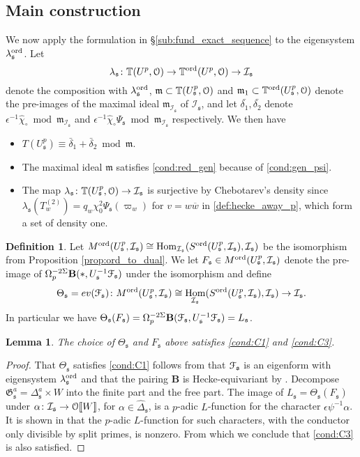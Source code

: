 \documentclass[leqno]{amsart}
\newtheorem{lem}[thm]{Lemma}
\theoremstyle{definition}
\newtheorem{defn}[thm]{Definition}
\theoremstyle{remark}
\newcommand{\eo}{\EuScript{O}}
\DeclareMathOperator{\Hom}{Hom}
\newcommand{\fm}{\mathfrak{m}}
\newcommand{\fs}{\mathfrak{s}}
\newcommand{\bw}{{\overline{w}}}
\newcommand{\fG}{\mathfrak{G}}
\newcommand{\TT}{\mathbb{T}} %
\newcommand{\euF}{\EuScript{F}} %
\newcommand{\I}{\mathcal{I}} %
\newcommand{\ord}{\textnormal{ord}} %
\begin{document}
\subsection{Main construction}

We now apply the formulation in \S\ref{sub:fund_exact_sequence}
to the eigensystem $\lambda^{\ord}_\fs$. Let
\[
    \lambda_\fs\colon \TT(U^p,\eo)\to\TT^{\ord}(U^p,\eo)\to\I_\fs
\]
denote the composition with $\lambda^{\ord}_\fs$,
$\fm\subset \TT(U^p_\fs,\eo)$ and
$\fm_1\subset \TT^\ord(U^p_\fs,\eo)$
denote the pre-images of the maximal ideal $\fm_{\I_\fs}$ of $\I_\fs$,
and let $\bar{\delta_1}, \bar{\delta_2}$
denote $\epsilon^{-1}\hat{\chi}_\circ\bmod \fm_{\I_\fs}$ 
and $\epsilon^{-1}\hat{\chi}_\circ\Psi_\fs\bmod \fm_{\I_\fs}$ 
respectively. We then have
\begin{itemize}
\item $T(U^p_\fs)\equiv\bar{\delta}_1+\bar{\delta}_2\bmod \fm$.
\item The maximal ideal $\fm$ satisfies \eqref{cond:red_gen}
because of \eqref{cond:gen_psi}.
\item The map $\lambda_\fs\colon \TT(U^p_\fs,\eo)\to \I_\fs$
is surjective by Chebotarev's density
since $\lambda_\fs(T_w^{(2)})=q_w\chi_0^2\Psi_\fs(\varpi_w)$
for $v=w\bw$ in \eqref{def:hecke_away_p},
which form a set of density one.
\end{itemize}

\begin{defn}
Let $M^{\ord}(U^p_\fs,\I_\fs)\cong\Hom_{\I_\fs}
(S^{\ord}(U^p_\fs,\I_\fs),\I_\fs)$
be the isomorphism from Proposition \ref{prop:ord_to_dual}.
We let $F_\fs\in M^{\ord}(U^p_\fs,\I_\fs)$
denote the pre-image of
$\Omega_p^{-2\Sigma}\mathbf{B}(*,U_\fs^{-1}\euF_{\fs})$
under the isomorphism and define
\[
    \Theta_\fs=ev(\euF_\fs)\colon 
    M^{\ord}(U^p_\fs,\I_\fs)\cong\Hom_{\I_\fs}
    (S^{\ord}(U^p_\fs,\I_\fs),\I_\fs)\to\I_\fs.
\]
In particular we have $\Theta_\fs(F_\fs)=
\Omega_p^{-2\Sigma}\mathbf{B}(\euF_\fs,U_\fs^{-1}\euF_\fs)=L_\fs$.
\end{defn}

\begin{lem}
The choice of $\Theta_\fs$ and $F_\fs$ above
satisfies \ref{cond:C1} and \ref{cond:C3}.
\end{lem}
\begin{proof}
That $\Theta_\fs$ satisfies \ref{cond:C1} 
follows from that $\euF_\fs$ is an eigenform
with eigensystem $\lambda_\fs^{\ord}$
and that the pairing $\mathbf{B}$ is Hecke-equivariant
by \cite[Rmk 5.13]{lee}.
Decompose $\fG_\fs^a=\Delta_\fs^a\times W$
into the finite part and the free part.
The image of $L_\fs=\Theta_\fs(F_\fs)$
under $\alpha\colon \I_\fs\to \eo\llbracket W\rrbracket$,
for $\alpha\in\hat{\Delta}_\fs$,
is a $p$-adic $L$-function 
for the character $\epsilon\psi^{-1}\alpha$.
It is shown in \cite{Hida10}
that the $p$-adic $L$-function for such characters,
with the conductor only divisible by split primes,
is nonzero.
From which we conclude that \ref{cond:C3}
is also satisfied.
\end{proof}
\end{document}
